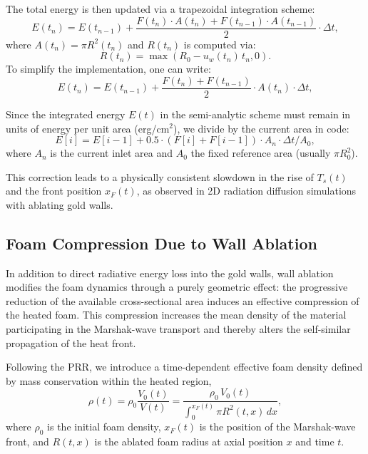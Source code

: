 \documentclass{article}
\begin{document}
The total energy is then updated via a trapezoidal integration scheme:
\begin{equation}
E(t_n) = E(t_{n-1}) + \frac{F(t_n)\cdot A(t_n) + F(t_{n-1})\cdot A(t_{n-1})}{2}  \cdot \Delta t,
\end{equation}
where $A(t_n) = \pi R^2(t_n)$ and $R(t_n)$ is computed via:
\begin{equation}
R(t_n) = \max\left(R_0 - u_w(t_n)\,t_n, 0\right).
\end{equation}
To simplify the implementation, one can write:
\begin{equation}
E(t_n) = E(t_{n-1}) + \frac{F(t_n) + F(t_{n-1})}{2} \cdot A(t_n) \cdot \Delta t,
\end{equation}

Since the integrated energy $E(t)$ in the semi-analytic scheme must remain in units of energy per unit area (erg/cm$^2$), we divide by the current area in code:
\begin{equation}
E[i] = E[i - 1] + 0.5 \cdot (F[i] + F[i-1]) \cdot A_n \cdot \Delta t / A_0,
\end{equation}
where $A_n$ is the current inlet area and $A_0$ the fixed reference area (usually $\pi R_0^2$).

This correction leads to a physically consistent slowdown in the rise of $T_s(t)$ and the front position $x_F(t)$, as observed in 2D radiation diffusion simulations with ablating gold walls.

\subsection*{Foam Compression Due to Wall Ablation}
\label{subsec:foam_compression}

In addition to direct radiative energy loss into the gold walls, wall ablation modifies the foam dynamics through a purely geometric effect: the progressive reduction of the available cross-sectional area induces an effective compression of the heated foam. This compression increases the mean density of the material participating in the Marshak-wave transport and thereby alters the self-similar propagation of the heat front.

Following the PRR, we introduce a time-dependent effective foam density defined by mass conservation within the heated region,
\begin{equation}
\rho(t)
= \rho_0 \frac{V_0(t)}{V(t)}
= \frac{\rho_0\,V_0(t)}
{\displaystyle \int_0^{x_F(t)} \pi R^2(t,x)\,dx},
\label{eq:rho_eff_cont}
\end{equation}
where $\rho_0$ is the initial foam density, $x_F(t)$ is the position of the Marshak-wave front, and $R(t,x)$ is the ablated foam radius at axial position $x$ and time $t$.
\end{document}

